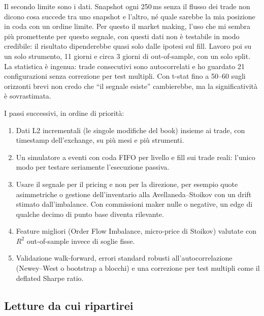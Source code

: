 \documentclass[a4paper,11pt]{article}
\begin{document}
Il secondo limite sono i dati. Snapshot ogni 250\,ms senza il flusso dei trade non dicono cosa
succede tra uno snapshot e l'altro, né quale sarebbe la mia posizione in coda con un ordine
limite. Per questo il market making, l'uso che mi sembra più promettente per questo segnale,
con questi dati non è testabile in modo credibile: il risultato dipenderebbe quasi solo dalle
ipotesi sul fill. Lavoro poi su un solo strumento, 11 giorni e circa 3 giorni di
out-of-sample, con un solo split. La statistica è ingenua: trade consecutivi sono
autocorrelati e ho guardato 21 configurazioni senza correzione per test multipli. Con t-stat
fino a 50--60 sugli orizzonti brevi non credo che ``il segnale esiste'' cambierebbe, ma la
significatività è sovrastimata.

I passi successivi, in ordine di priorità:
\begin{enumerate}[leftmargin=*]
  \item Dati L2 incrementali (le singole modifiche del book) insieme ai trade, con timestamp
        dell'exchange, su più mesi e più strumenti.
  \item Un simulatore a eventi con coda FIFO per livello e fill sui trade reali: l'unico modo
        per testare seriamente l'esecuzione passiva.
  \item Usare il segnale per il pricing e non per la direzione, per esempio quote asimmetriche
        o gestione dell'inventario alla Avellaneda--Stoikov con un drift stimato
        dall'imbalance. Con commissioni maker nulle o negative, un edge di
        qualche decimo di punto base diventa rilevante.
  \item Feature migliori (Order Flow Imbalance, micro-price di Stoikov) valutate con $R^2$
        out-of-sample invece di soglie fisse.
  \item Validazione walk-forward, errori standard robusti all'autocorrelazione (Newey--West o
        bootstrap a blocchi) e una correzione per test multipli come il deflated Sharpe
        ratio.
\end{enumerate}

\subsection{Letture da cui ripartirei}
\label{sec:letture}
\end{document}
